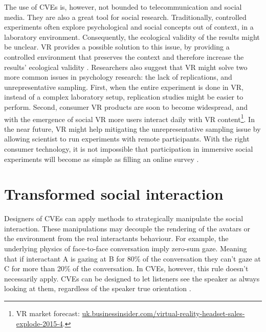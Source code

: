 \documentclass[]{simple-thesis}
\begin{document}
The use of CVEs is, however, not bounded to telecommunication and social media.
They are also a great tool for social research.
Traditionally, controlled experiments often explore psychological and social concepts out of context, in a laboratory environment.
Consequently, the ecological validity of the results might be unclear.
VR provides a possible solution to this issue, by providing a controlled environment that preserves the context and therefore increase the results' ecological validity \citep{Loomis1999}.
Researchers also suggest that VR might solve two more common issues in psychology research: the lack of replications, and unrepresentative sampling.
First, when the entire experiment is done in VR, instead of a complex laboratory setup, replication studies might be easier to perform.
Second, consumer VR products are soon to become widespread, and with the emergence of social VR more users interact daily with VR content\footnote{VR market forecast: \href{http://uk.businessinsider.com/virtual-reality-headset-sales-explode-2015-4}{uk.businessinsider.com/virtual-reality-headset-sales-explode-2015-4}.}.
In the near future, VR might help mitigating the unrepresentative sampling issue by allowing scientist to run experiments with remote participants.
With the right consumer technology, it is not impossible that participation in immersive social experiments will become as simple as filling an online survey \citep{Blascovich2002}.

\section{Transformed social interaction}

Designers of CVEs can apply methods to strategically manipulate the social interaction.
These manipulations may decouple the rendering of the avatars or the environment from the real interactants behaviour.
For example, the underlying physics of face-to-face conversation imply zero-sum gaze.
Meaning that if interactant A is gazing at B for 80\% of the conversation they can't gaze at C for more than 20\% of the conversation.
In CVEs, however, this rule doesn't necessarily apply.
CVEs can be designed to let listeners see the speaker as always looking at them, regardless of the speaker true orientation \citep{Beall2003}.
\end{document}
